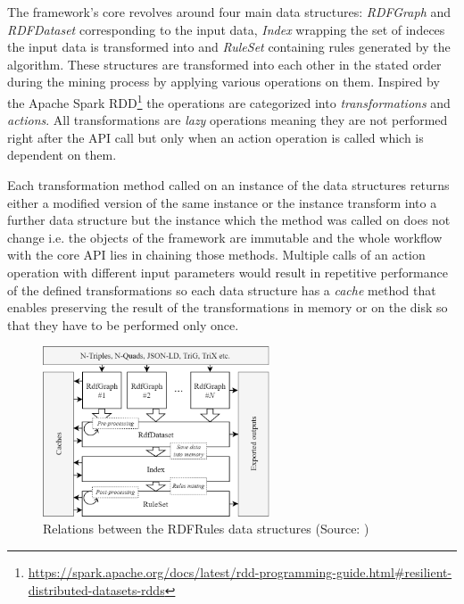 The framework's core revolves around four main data structures: \textit{RDFGraph} and \textit{RDFDataset} corresponding to the input data, \textit{Index} wrapping the set of indeces the input data is transformed into and \textit{RuleSet} containing rules generated by the algorithm. These structures are transformed into each other in the stated order during the mining process by applying various operations on them. Inspired by the Apache Spark RDD\footnote{\href{https://spark.apache.org/docs/latest/rdd-programming-guide.html\#resilient-distributed-datasets-rdds}{https://spark.apache.org/docs/latest/rdd-programming-guide.html\#resilient-distributed-datasets-rdds}} the operations are categorized into \textit{transformations} and \textit{actions}. All transformations are \textit{lazy} operations meaning they are not performed right after the API call but only when an action operation is called which is dependent on them.

Each transformation method called on an instance of the data structures returns either a modified version of the same instance or the instance transform into a further data structure but the instance which the method was called on does not change i.e. the objects of the framework are immutable and the whole workflow with the core API lies in chaining those methods. Multiple calls of an action operation with different input parameters would result in repetitive performance of the defined transformations so each data structure has a \textit{cache} method that enables preserving the result of the transformations in memory or on the disk so that they have to be performed only once.

\begin{figure}[h]
\centering
\includegraphics[width=0.6\textwidth]{img/rdfrules-abstractions.png}
\caption{Relations between the RDFRules data structures (Source: \cite{Zeman2018})}
\label{rdfrulesdatastructures}
\end{figure}

